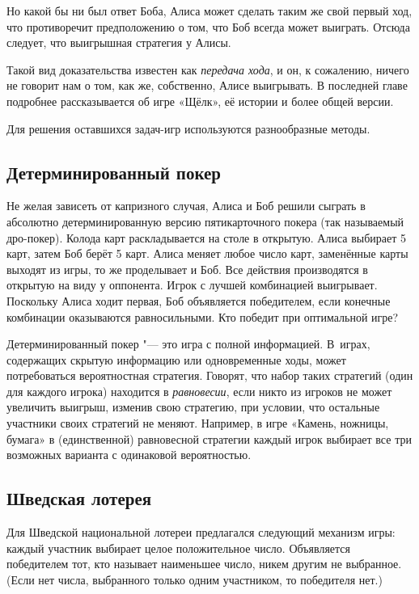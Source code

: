 \documentclass[twoside]{book}
\makeatletter
\newcommand{\rindex}[2][\imki@jobname]{%
  \index[#1]{\detokenize{#2}}%
}
\makeatother
\begin{document}
Но какой бы ни был ответ Боба, Алиса может сделать таким же свой первый ход, что противоречит предположению о том, что Боб всегда может выиграть.
Отсюда следует,
что выигрышная стратегия у Алисы.
\heart

Такой вид доказательства известен как \emph{передача хода}, и он, к сожалению, ничего не говорит нам о том, как же, собственно, Алисе выигрывать.
В последней главе подробнее рассказывается об игре «Щёлк», её истории и более общей версии.

\medskip

Для решения оставшихся задач-игр используются разнообразные методы.

\subsection*{Детерминированный покер}%
\rindex{Детерминированный покер}

Не желая зависеть от капризного случая, Алиса и Боб решили сыграть в абсолютно детерминированную версию пятикарточного покера (так называемый дро-покер).
Колода карт раскладывается на столе в открытую.
Алиса выбирает 5 карт, затем Боб берёт 5 карт.
Алиса меняет любое число карт, заменённые карты выходят из игры, то же проделывает и Боб.
Все действия производятся в открытую на виду у оппонента.
Игрок с лучшей комбинацией выигрывает.
Поскольку Алиса ходит первая, Боб объявляется победителем, если конечные комбинации оказываются равносильными.
Кто победит при оптимальной игре?

\medskip

Детерминированный покер "--- это игра с полной информацией.
В~играх, содержащих скрытую информацию или одновременные ходы, может потребоваться вероятностная стратегия.
Говорят, что набор таких стратегий (один для каждого игрока) находится в \emph{равновесии}, если никто из игроков не может увеличить выигрыш, изменив свою стратегию, при условии, что остальные участники своих стратегий не меняют.
Например, в игре «Камень, ножницы, бумага» в (единственной) равновесной стратегии каждый игрок выбирает все три возможных варианта с одинаковой вероятностью.

\subsection*{Шведская лотерея}%
\rindex{Шведская лотерея}

Для Шведской национальной лотереи предлагался следующий механизм игры: каждый участник выбирает целое положительное число.
Объявляется победителем тот, кто называет наименьшее число, никем другим не выбранное.
(Если нет числа, выбранного только одним участником, то победителя нет.)
\end{document}
